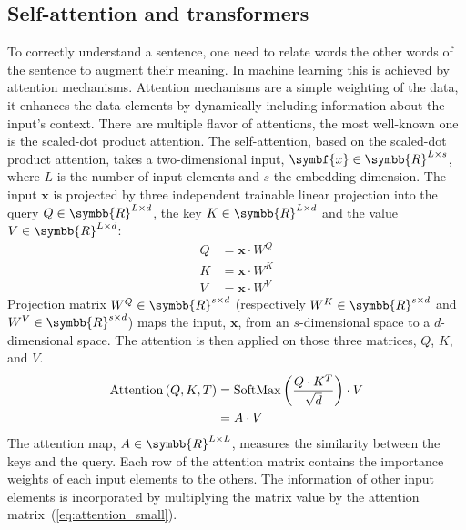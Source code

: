 \documentclass[../main.tex]{subfiles}
\begin{document}
 \subsection{Self-attention and transformers}
     To correctly understand a sentence, one need to relate words the other words of the sentence to augment their meaning.
     In machine learning this is achieved by attention mechanisms.
     Attention mechanisms are a simple weighting of the data, it enhances the data elements by dynamically including information about the input's context.
     There are multiple flavor of attentions, the most well-known one is the scaled-dot product attention.
     The self-attention, based on the scaled-dot product attention, takes a two-dimensional input, \(\symbf{x} \in \symbb{R}^{L\times s}\), where \(L\) is the number of input elements and \(s\) the embedding dimension.
     The input \(\symbf{x}\) is projected by three independent trainable linear projection into the query \(Q \in \symbb{R}^{L \times d}\), the key \(K \in \symbb{R}^{L \times d}\) and the value \(V \in \symbb{R}^{L \times d}\):
     \begin{align}
         Q & = \symbf{x}\cdot W^{Q} \\
         K & = \symbf{x}\cdot W^{K} \\
         V & = \symbf{x}\cdot W^{V}
     \end{align}
     Projection matrix \(W^Q \in \symbb{R}^{s \times d} \) (respectively \(W^K\in \symbb{R}^{s \times d}\) and \(W^V\in \symbb{R}^{s \times d}\)) maps the input, \(\symbf{x}\), from an \(s\)-dimensional space to a \(d\)-dimensional space.
     The attention is then applied on those three matrices, \(Q\), \(K\), and \(V\).
     \begin{align}
         \operatorname{Attention}\left(Q,K,T\right) & = \operatorname{SoftMax}\left( \frac{Q\cdot K^T}{\sqrt{d}}\right) \cdot V\label{eq:selfattention} \\
                                                    & = A \cdot V \label{eq:attention_small}
     \end{align}
     The attention map, \(A \in \symbb{R}^{L \times L}\), measures the similarity between the keys and the query.
     Each row of the attention matrix contains the importance weights of each input elements to the others.
     The information of other input elements is incorporated by multiplying the matrix value by the attention matrix~(\cref{eq:attention_small}).
\end{document}
